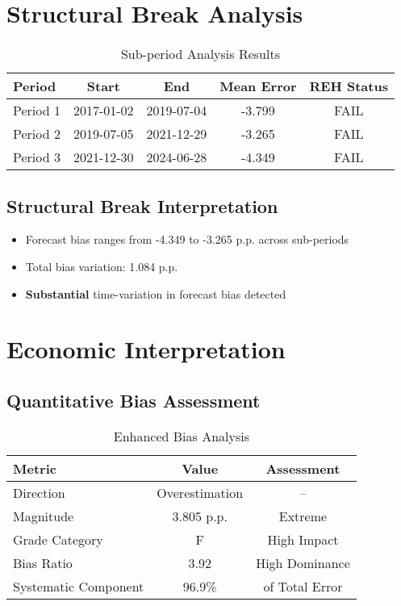\documentclass[11pt,a4paper]{article}
\begin{document}
\section{Structural Break Analysis}

\begin{table}[H]
\centering
\caption{Sub-period Analysis Results}
\begin{tabular}{lcccc}
\toprule
\textbf{Period} & \textbf{Start} & \textbf{End} & \textbf{Mean Error} & \textbf{REH Status} \\
\midrule
Period 1 & 2017-01-02 & 2019-07-04 & -3.799 & \textcolor{academicred}{FAIL} \\
Period 2 & 2019-07-05 & 2021-12-29 & -3.265 & \textcolor{academicred}{FAIL} \\
Period 3 & 2021-12-30 & 2024-06-28 & -4.349 & \textcolor{academicred}{FAIL} \\
\bottomrule
\end{tabular}
\end{table}

\subsection{Structural Break Interpretation}
\begin{itemize}
\item Forecast bias ranges from -4.349 to -3.265 p.p. across sub-periods
\item Total bias variation: 1.084 p.p.
\item \textbf{Substantial} time-variation in forecast bias detected
\end{itemize}

\section{Economic Interpretation}

\subsection{Quantitative Bias Assessment}
\begin{table}[H]
\centering
\caption{Enhanced Bias Analysis}
\begin{tabular}{lcc}
\toprule
\textbf{Metric} & \textbf{Value} & \textbf{Assessment} \\
\midrule
Direction & Overestimation & -- \\
Magnitude & 3.805 p.p. & Extreme \\
Grade Category & F & High Impact \\
Bias Ratio & 3.92 & High Dominance \\
Systematic Component & 96.9\% & of Total Error \\
\bottomrule
\end{tabular}
\end{table}
\end{document}
